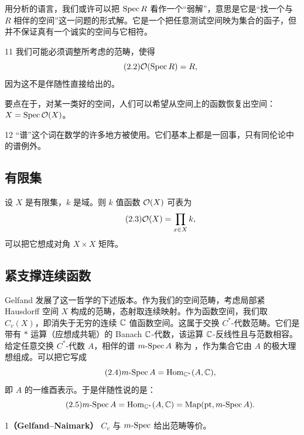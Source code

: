 用分析的语言，我们或许可以把 $\mathrm{Spec}\,R$ 看作一个“弱解”，意思是它是“找一个与 $R$ 相伴的空间”这一问题的形式解。它是一个把任意测试空间映为集合的函子，但并不保证真有一个诚实的空间与它相符。

\begin{srcrem}{11}
我们可能必须调整所考虑的范畴，使得
\begin{equation}\tag{2.2}
\mathcal{O}(\mathrm{Spec}\,R)=R,
\end{equation}
因为这不是伴随性直接给出的。
\end{srcrem}

要点在于，对某一类好的空间，人们可以希望从空间上的函数恢复出空间：$X=\mathrm{Spec}\,\mathcal{O}(X)$。

\begin{srcrem}{12}
“谱”这个词在数学的许多地方被使用。它们基本上都是一回事，只有同伦论中的谱例外。
\end{srcrem}

\subsection{有限集}

设 $X$ 是有限集，$k$ 是域。则 $k$ 值函数 $\mathcal{O}(X)$ 可表为
\begin{equation}\tag{2.3}
\mathcal{O}(X)=\prod_{x\in X}k,
\end{equation}
可以把它想成对角 $X\times X$ 矩阵。

\subsection{紧支撑连续函数}

Gelfand 发展了这一哲学的下述版本。作为我们的空间范畴，考虑局部紧 Hausdorff 空间 $X$ 构成的范畴，态射取连续映射。作为函数空间，我们取 $C_v(X)$，即消失于无穷的连续 $\mathbb{C}$ 值函数空间。这属于交换 $C^{*}$-代数范畴。它们是带有 $*$ 运算（应想成共轭）的 Banach $\mathbb{C}$-代数，该运算 $\mathbb{C}$-反线性且与范数相容。给定任意交换 $C^{*}$-代数 $A$，相伴的谱 $m\text{-}\mathrm{Spec}\,A$ 称为 ，作为集合它由 $A$ 的极大理想组成。可以把它写成
\begin{equation}\tag{2.4}
m\text{-}\mathrm{Spec}\,A=\mathrm{Hom}_{\mathbb{C}^{*}}(A,\mathbb{C}),
\end{equation}
即 $A$ 的一维酉表示。于是伴随性说的是：
\begin{equation}\tag{2.5}
m\text{-}\mathrm{Spec}\,A=\mathrm{Hom}_{\mathbb{C}^{*}}(A,\mathbb{C})=\operatorname{Map}(\mathrm{pt},m\text{-}\mathrm{Spec}\,A).
\end{equation}

\begin{srcthm}{1}\textbf{（Gelfand--Naimark）}
$C_v$ 与 $m\text{-}\mathrm{Spec}$ 给出范畴等价。
\end{srcthm}

